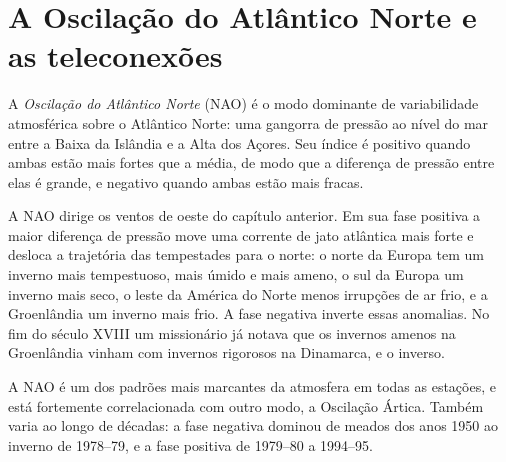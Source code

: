 \section{A Oscilação do Atlântico Norte e as teleconexões}\label{sec:b2:climate-variability:nao}

\begin{definition}\label{def:b2:climate-variability:nao}
A \emph{Oscilação do Atlântico Norte} (NAO) é o modo dominante
de variabilidade atmosférica sobre o Atlântico Norte: uma gangorra de pressão ao nível do mar entre a
Baixa da Islândia e a Alta dos Açores. Seu índice é positivo quando ambas estão mais fortes que a média, de modo
que a diferença de pressão entre elas é grande, e negativo quando ambas estão mais fracas.
\end{definition}

A NAO dirige os ventos de oeste do capítulo anterior. Em sua fase positiva a maior diferença de
pressão move uma corrente de jato atlântica mais forte e desloca a trajetória das tempestades para o norte: o norte da Europa
tem um inverno mais tempestuoso, mais úmido e mais ameno, o sul da Europa um inverno mais seco, o leste da América do Norte
menos irrupções de ar frio, e a Groenlândia um inverno mais frio. A fase negativa inverte essas
anomalias. No fim do século XVIII um missionário já notava que os invernos amenos na
Groenlândia vinham com invernos rigorosos na Dinamarca, e o inverso.

A NAO é um dos padrões mais marcantes da atmosfera em todas as estações, e está
fortemente correlacionada com outro modo, a Oscilação Ártica. Também varia ao longo de décadas: a fase negativa dominou
de meados dos anos 1950 ao inverno de 1978--79, e a fase positiva de 1979--80 a 1994--95.

